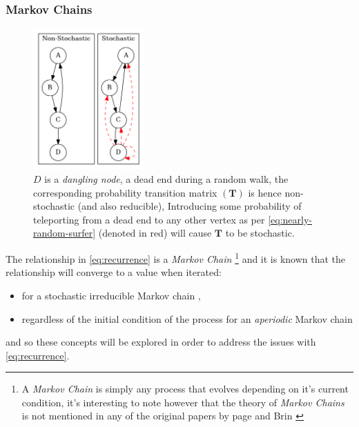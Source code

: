 \documentclass[11pt]{report}
\begin{document}
\subsubsection{Markov Chains}
\label{markov}

\begin{figure}
    \includegraphics[width=0.38\textwidth]{media/dot/stochastic_graph_example.dot.png}
    \caption{\label{fig:stochastic-example}\(D\) is a \emph{dangling node}, a dead end during a random walk, the corresponding probability transition matrix \((\mathbf{T})\) is hence non-stochastic (and also reducible), Introducing some probability of teleporting from a dead end to any other vertex as per \eqref{eq:nearly-random-surfer} (denoted in red) will cause \(\mathbf{T}\) to be stochastic.}
\end{figure}

The relationship in \eqref{eq:recurrence} is a \emph{Markov Chain} \footnote{A \emph{Markov Chain} is
simply any process that evolves depending on it's current condition, it's
interesting to note however that the theory of \emph{Markov Chains} is not mentioned in any
of the original papers by page and Brin
\cite[]{langvilleGooglePageRankScience2012}}  and it is known
that the relationship will converge to a value when iterated:

\begin{itemize}
\item for a stochastic irreducible Markov chain \cite[.5]{larsonElementaryLinearAlgebra1991},
\item regardless of the initial condition of the process for an \emph{aperiodic} Markov chain \cite[]{langvilleGooglePageRankScience2012}
\end{itemize}

and so these concepts will be explored in order to address the issues with \eqref{eq:recurrence}.
\end{document}
